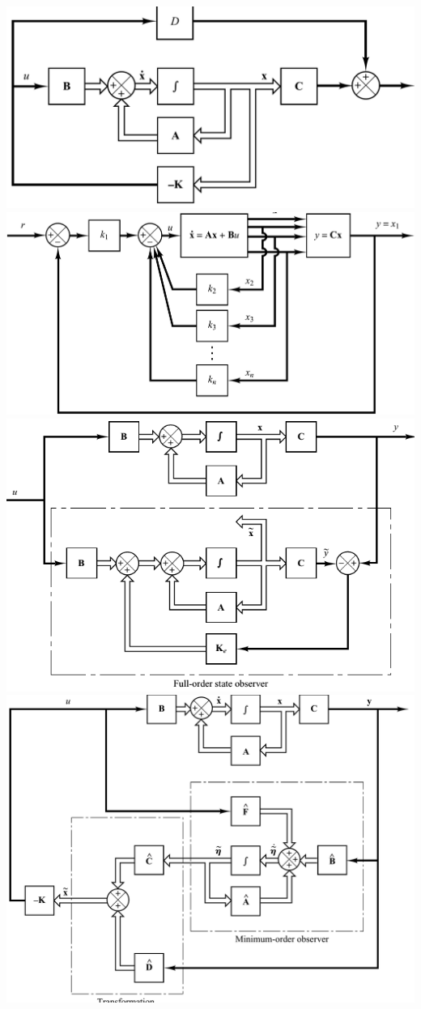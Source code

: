 \includegraphics[width=\linewidth]{keFeedback.png}
\includegraphics[width=\linewidth]{whyNot.png}
\includegraphics[width=\linewidth]{full-state-obs.png}
\includegraphics[width=\linewidth]{min-order-observer.png}




